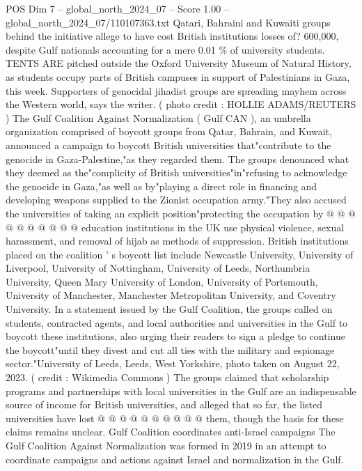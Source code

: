 \begin{textsample}{POS Dim 7 – global\_north\_2024\_07 – Score 1.00 – global\_north\_2024\_07/110107363.txt}  \label{ex:f7_pos_335}
Qatari, Bahraini and Kuwaiti groups behind the initiative allege to have cost British institutions losses of? 600,000, despite Gulf nationals accounting for a mere 0.01 \% of university students.
TENTS ARE pitched outside the Oxford University Museum of Natural History, as students occupy parts of British campuses in support of Palestinians in Gaza, this week.
Supporters of genocidal jihadist groups are spreading mayhem across the Western world, says the writer. ( photo credit : HOLLIE ADAMS/REUTERS ) The Gulf Coalition Against Normalization ( Gulf CAN ), an umbrella organization comprised of boycott groups from Qatar, Bahrain, and Kuwait, announced a campaign to boycott British universities that"contribute to the genocide in Gaza-Palestine,"as they regarded them.
The groups denounced what they deemed as the"complicity of British universities"in"refusing to acknowledge the genocide in Gaza,"as well as by"playing a direct role in financing and developing weapons supplied to the Zionist occupation army."They also accused the universities of taking an explicit position"protecting the occupation by @ @ @ @ @ @ @ @ @ @ education institutions in the UK use physical violence, sexual harassment, and removal of hijab as methods of suppression.
British institutions placed on the coalition ' s boycott list include Newcastle University, University of Liverpool, University of Nottingham, University of Leeds, Northumbria University, Queen Mary University of London, University of Portsmouth, University of Manchester, Manchester Metropolitan University, and Coventry University.
In a statement issued by the Gulf Coalition, the groups called on students, contracted agents, and local authorities and universities in the Gulf to boycott these institutions, also urging their readers to sign a pledge to continue the boycott"until they divest and cut all ties with the military and espionage sector."University of Leeds, Leeds, West Yorkshire, photo taken on August 22, 2023. ( credit : Wikimedia Commons ) The groups claimed that scholarship programs and partnerships with local universities in the Gulf are an indispensable source of income for British universities, and alleged that so far, the listed universities have lost @ @ @ @ @ @ @ @ @ @ them, though the basis for these claims remains unclear.
Gulf Coalition coordinates anti-Israel campaigns The Gulf Coalition Against Normalization was formed in 2019 in an attempt to coordinate campaigns and actions against Israel and normalization in the Gulf.

\end{textsample}
